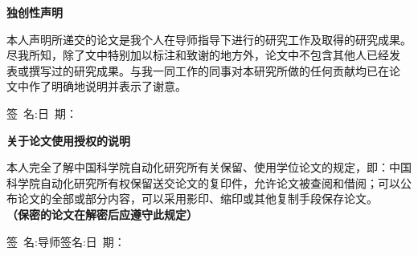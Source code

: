 \thispagestyle{empty} %
\vspace*{1.0cm}

\centerline{\erhao \song \textsf{\textbf{独创性声明}}}
\vspace*{0.5cm}
{\small
本人声明所递交的论文是我个人在导师指导下进行的研究工作及取得的研究成果。
尽我所知，除了文中特别加以标注和致谢的地方外，论文中不包含其他人已经发
表或撰写过的研究成果。与我一同工作的同事对本研究所做的任何贡献均已在论
文中作了明确地说明并表示了谢意。

\hspace*{4.5cm}签~名:\underline{\hspace{3.0cm}}日~期：\underline{\hspace{3.0cm}}}

\vspace*{3.0cm}

\centerline{\erhao \song \textsf{\textbf{关于论文使用授权的说明}}}
\vspace*{0.5cm}
{\small
本人完全了解中国科学院自动化研究所有关保留、使用学位论文的规定，即：中国
科学院自动化研究所有权保留送交论文的复印件，允许论文被查阅和借阅；可以公
布论文的全部或部分内容，可以采用影印、缩印或其他复制手段保存论文。\\
{\bf（保密的论文在解密后应遵守此规定）}
\vspace*{3.5cm}

\centerline{签~名:\underline{\hspace{3.0cm}}导师签名:\underline{\hspace{3.0cm}}日~期：\underline{\hspace{3.0cm}}}
}
